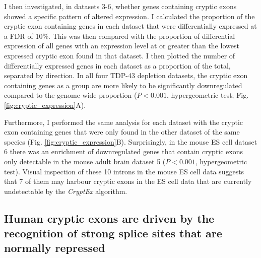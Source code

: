 I then investigated, in datasets 3-6, whether genes containing cryptic exons showed a specific pattern of altered expression. I calculated the proportion of the cryptic exon containing genes in each dataset that were differentially expressed at a FDR of 10\%. This was then compared with the proportion of differential expression of all genes with an expression level at or greater than the lowest expressed cryptic exon found in that dataset. I then plotted the number of differentially expressed genes in each dataset as a proportion of the total, separated by direction. In all four TDP-43 depletion datasets, the cryptic exon containing genes as a group are more likely to be significantly downregulated compared to the genome-wide proportion ($P < 0.001$, hypergeometric test; Fig. \ref{fig:cryptic_expression}A).

Furthermore, I performed the same analysis for each dataset with the cryptic exon containing genes that were only found in the other dataset of the same species (Fig. \ref{fig:cryptic_expression}B). Surprisingly, in the mouse ES cell dataset 6 there was an enrichment of downregulated genes that contain cryptic exons only detectable in the mouse adult brain dataset 5 ($P < 0.001$, hypergeometric test). Visual inspection of these 10 introns in the mouse ES cell data suggests that 7 of them may harbour cryptic exons in the ES cell data that are currently undetectable by the \emph{CryptEx} algorithm.


\subsection{Human cryptic exons are driven by the recognition of strong splice sites that are normally repressed}

